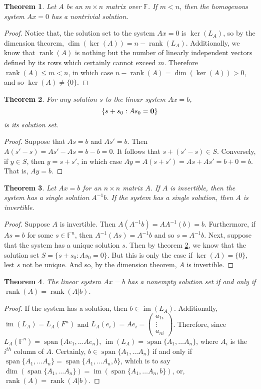 \documentclass[oneside, 12pt]{book}
\DeclareMathOperator{\rank}{rank}
\DeclareMathOperator{\spn}{span}
\DeclareMathOperator{\im}{im}
\newtheorem{thm}{Theorem}[section]
\theoremstyle{definition}
\begin{document}
\begin{thm}
\label{thm_homsoln}
Let $A$ be an $m \times n$ matrix over $\mathbb{F}$. If $m<n$, then the homogenous system $Ax=0$ has a nontrivial solution.
\end{thm}
\begin{proof}
  Notice that, the solution set to the system $Ax=0$ is $\ker(L_{A})$, so by the dimension theorem, $\dim(\ker(A))=n-\rank(L_{A})$. Additionally,
  we know that $\rank(A)$ is nothing but the number of linearly independent vectors defined by its rows which certainly cannot exceed $m$. Therefore
  $\rank(A) \leq m < n$, in which case $n-\rank(A)=\dim(\ker(A))>0$, and so $\ker(A)\neq \{0 \}$.
\end{proof}
\begin{thm}
  \label{thm_gensoln}
For any solution $s$ to the linear system $Ax=b$, \[\{s+s_{0}:As_{0}=\bold{0} \}\] is its solution set.
\end{thm}
\begin{proof}
Suppose that $As=b$ and $As'=b$. Then $A(s'-s)=As'-As=b-b=0$. It follows that $s+(s'-s) \in S$. Conversely, if $y \in S$, then $y=s+s'$, in which case $Ay=A(s+s')=As+As'=b+0=b$. That is, $Ay=b$.
\end{proof}
\begin{thm}
  \label{thm_uniqsoln}
  Let $Ax=b$ for an $n \times n$ matrix $A$. If $A$ is invertible, then the system has a single solution $A^{-1}b$. If the system has a single solution, then $A$ is invertible.
\end{thm}
\begin{proof}
Suppose $A$ is invertible. Then $A(A^{-1}b)=AA^{-1}(b)=b$. Furthermore, if $As=b$ for some $s \in \mathbb{F}^{n}$, then $A^{-1}(As)=A^{-1}b$ and so $s=A^{-1}b$.
Next, suppose that the system has a unique solution $s$. Then by theorem \ref{thm_gensoln}, we know that the solution set $S=\{s+s_{0}: As_{0}=0 \}$. But this is only the case if $\ker(A)=\{0\}$, lest $s$ not be unique. And so, by the dimension theorem, $A$ is invertible.
\end{proof}
\begin{thm}
\label{thm_nonemsoln}
The linear system $Ax=b$ has a nonempty solution set if and only if $\rank(A)=\rank(A|b)$.
\end{thm}
\begin{proof}
  If the system has a solution, then $b \in \im(L_{A})$. Additionally, $\im(L_{A})=L_{A}(F^{n})$ and $L_{A}(e_{i})=Ae_{i}=
  \begin{pmatrix} a_{1i} \\ \vdots \\ a_{ni}   \end{pmatrix}$. Therefore, since $L_{A}(\mathbb{F}^{n})= \spn \{Ae_{1}, \dots Ae_{n}\}$,
  $\im(L_{A})=\spn\{A_{1}, \dots A_{n}\}$, where $A_{i}$ is the $i^{th}$ column of $A$.
  Certainly, $b \in \spn\{A_{1}, \dots A_{n}\}$ if and only if $\spn\{A_{1}, \dots A_{n}\}=\spn\{A_{1}, \dots A_{n}, b\}$, which is to say
  $\dim(\spn\{A_{1}, \dots A_{n}\})=\im(\spn\{A_{1}, \dots A_{n}, b\})$, or, $\rank(A)=\rank(A|b)$.
\end{proof}
\pagebreak
\end{document}
